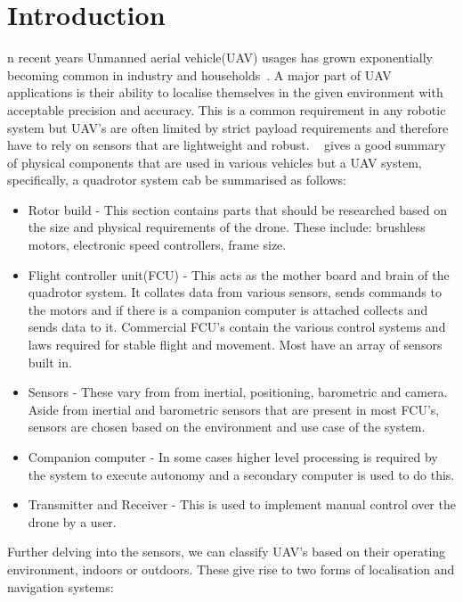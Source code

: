 \let\textcircled=\pgftextcircled
\chapter{Introduction}\label{ch:intro}%
    n recent years Unmanned aerial vehicle(UAV) usages has grown exponentially becoming common in industry and households~\cite{custers2016drones}.
    A major part of UAV applications is their ability to localise themselves in the given environment with acceptable precision and accuracy.
    This is a common requirement in any robotic system but UAV's are often limited by strict payload requirements and therefore have to rely on sensors that are lightweight and robust.
    ~\citep{ardupilotadvanced} gives a good summary of physical components that are used in various vehicles but a UAV system, specifically, a quadrotor system cab be summarised as follows:
    \begin{itemize}
        \item Rotor build - This section contains parts that should be researched based on the size and physical requirements of the drone.
        These include: brushless motors, electronic speed controllers, frame size.
        \item Flight controller unit(FCU) - This acts as the mother board and brain of the quadrotor system.
        It collates data from various sensors, sends commands to the motors and if there is a companion computer is attached collects and sends data to it.
        Commercial FCU's contain the various control systems and laws required for stable flight and movement.
        Most have an array of sensors built in.
        \item Sensors - These vary from from inertial, positioning, barometric and camera.
        Aside from inertial and barometric sensors that are present in most FCU's, sensors are chosen based on the environment and use case of the system.
        \item Companion computer - In some cases higher level processing is required by the system to execute autonomy and a secondary computer is used to do this.
        \item Transmitter and Receiver - This is used to implement manual control over the drone by a user.
    \end{itemize}
    Further delving into the sensors, we can classify UAV's based on their operating environment, indoors or outdoors.
    These give rise to two forms of localisation and navigation systems:
